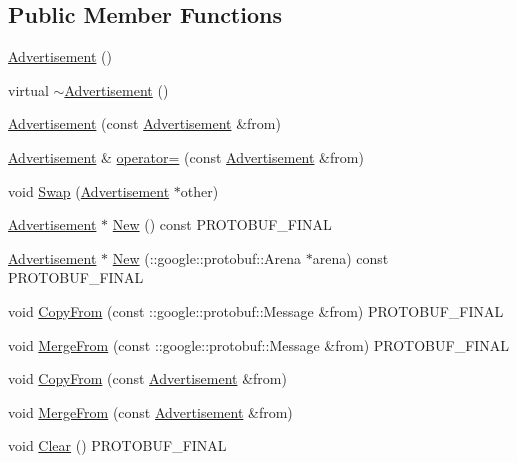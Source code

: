 \subsection*{Public Member Functions}
\begin{DoxyCompactItemize}
\item 
\hyperlink{class_advertisement_a2932354dce25b3f6b6a4af82a0e35db9}{Advertisement} ()
\item 
virtual \hyperlink{class_advertisement_a49170a22dcd2a8bf88d3ed1aad475b82}{$\sim$\+Advertisement} ()
\item 
\hyperlink{class_advertisement_a3ff57da26e6534cb2a130b4a5335492a}{Advertisement} (const \hyperlink{class_advertisement}{Advertisement} \&from)
\item 
\hyperlink{class_advertisement}{Advertisement} \& \hyperlink{class_advertisement_a245219dc727c1acbc22d7ce541d43f8b}{operator=} (const \hyperlink{class_advertisement}{Advertisement} \&from)
\item 
void \hyperlink{class_advertisement_aa981d999fe8394e184d36f5970e682f0}{Swap} (\hyperlink{class_advertisement}{Advertisement} $\ast$other)
\item 
\hyperlink{class_advertisement}{Advertisement} $\ast$ \hyperlink{class_advertisement_a86c4f8bed0f9b8a1f90b65da5aacd25d}{New} () const P\+R\+O\+T\+O\+B\+U\+F\+\_\+\+F\+I\+N\+AL
\item 
\hyperlink{class_advertisement}{Advertisement} $\ast$ \hyperlink{class_advertisement_a940cfe1ea161f8bc9a8c18efa5d9cde8}{New} (\+::google\+::protobuf\+::\+Arena $\ast$arena) const P\+R\+O\+T\+O\+B\+U\+F\+\_\+\+F\+I\+N\+AL
\item 
void \hyperlink{class_advertisement_a9ee96decf7b8ecdc05b3890ae23198f7}{Copy\+From} (const \+::google\+::protobuf\+::\+Message \&from) P\+R\+O\+T\+O\+B\+U\+F\+\_\+\+F\+I\+N\+AL
\item 
void \hyperlink{class_advertisement_ae6a97ef8e0fc8fbb7a83b541371ea1b8}{Merge\+From} (const \+::google\+::protobuf\+::\+Message \&from) P\+R\+O\+T\+O\+B\+U\+F\+\_\+\+F\+I\+N\+AL
\item 
void \hyperlink{class_advertisement_afc0c962367887d091805621cb282b542}{Copy\+From} (const \hyperlink{class_advertisement}{Advertisement} \&from)
\item 
void \hyperlink{class_advertisement_ad058035f7e184d6988c40a78dfd8d175}{Merge\+From} (const \hyperlink{class_advertisement}{Advertisement} \&from)
\item 
void \hyperlink{class_advertisement_a8c73d2885b5c1fd7dfb339a018715d37}{Clear} () P\+R\+O\+T\+O\+B\+U\+F\+\_\+\+F\+I\+N\+AL

\end{DoxyCompactItemize}
